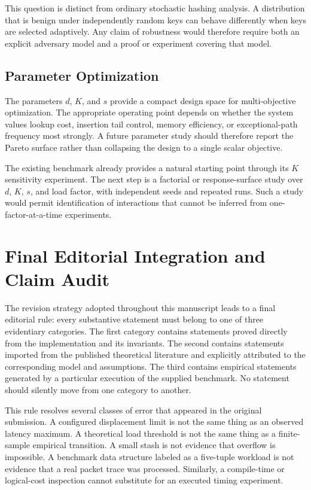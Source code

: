 \documentclass[conference]{IEEEtran}
\begin{document}
This question is distinct from ordinary stochastic hashing analysis. A distribution that is benign under independently random keys can behave differently when keys are selected adaptively. Any claim of robustness would therefore require both an explicit adversary model and a proof or experiment covering that model.

\subsection{Parameter Optimization}

The parameters $d$, $K$, and $s$ provide a compact design space for multi-objective optimization. The appropriate operating point depends on whether the system values lookup cost, insertion tail control, memory efficiency, or exceptional-path frequency most strongly. A future parameter study should therefore report the Pareto surface rather than collapsing the design to a single scalar objective.

The existing benchmark already provides a natural starting point through its $K$ sensitivity experiment. The next step is a factorial or response-surface study over $d$, $K$, $s$, and load factor, with independent seeds and repeated runs. Such a study would permit identification of interactions that cannot be inferred from one-factor-at-a-time experiments.

\section{Final Editorial Integration and Claim Audit}
\label{sec:final_audit}

The revision strategy adopted throughout this manuscript leads to a final editorial rule: every substantive statement must belong to one of three evidentiary categories. The first category contains statements proved directly from the implementation and its invariants. The second contains statements imported from the published theoretical literature and explicitly attributed to the corresponding model and assumptions. The third contains empirical statements generated by a particular execution of the supplied benchmark. No statement should silently move from one category to another.

This rule resolves several classes of error that appeared in the original submission. A configured displacement limit is not the same thing as an observed latency maximum. A theoretical load threshold is not the same thing as a finite-sample empirical transition. A small stash is not evidence that overflow is impossible. A benchmark data structure labeled as a five-tuple workload is not evidence that a real packet trace was processed. Similarly, a compile-time or logical-cost inspection cannot substitute for an executed timing experiment.
\end{document}
